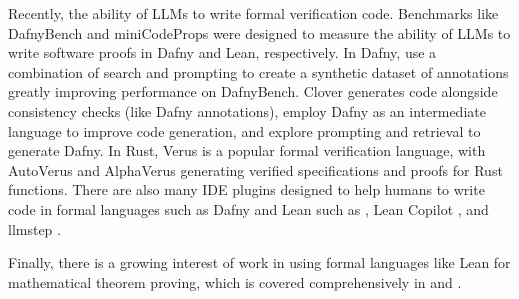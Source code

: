 Recently, the ability of LLMs to write formal verification code. Benchmarks like DafnyBench \citep{loughridge2024dafnybench} and miniCodeProps \citep{lohn2024minicodeprops} were designed to measure the ability of LLMs to write software proofs in Dafny and Lean, respectively. 
In Dafny, \citet{poesia2024dafny} use a combination of search and prompting to create a synthetic dataset of annotations greatly improving performance on DafnyBench. 
Clover \citep{sun2024clover} generates code alongside consistency checks (like Dafny annotations), \citet{li2025dafny} employ Dafny as an intermediate language to improve code generation, and \citet{misu2024towards} explore prompting and retrieval to generate Dafny. 
In Rust, Verus is a popular formal verification language, with AutoVerus \citep{yang2024autoverus} and AlphaVerus \citep{aggarwal2024alphaverus} generating verified specifications and proofs for Rust functions. 
There are also many IDE plugins designed to help humans to write code in formal languages such as Dafny and Lean such as \citet{silva2024leveraging}, Lean Copilot \citep{song2024towards}, and llmstep \citep{welleck2023llmstep}.


Finally, there is a growing interest of work in using formal languages like Lean for mathematical theorem proving, which is covered comprehensively in \citet{li2024survey} and \citet{yang2024formal}.
